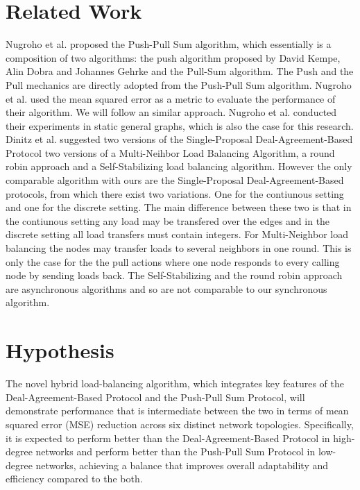 \section{Related Work}\label{sec:relatedwork}
Nugroho et al.\cite{nugroho2023PushPullSumDataAg} proposed the Push-Pull Sum algorithm, which essentially is a composition of two algorithms: the push algorithm proposed by David Kempe, Alin Dobra and Johannes Gehrke \cite{kempe2003gossipbasedComp} and the Pull-Sum algorithm. The Push and the Pull mechanics are directly adopted from the Push-Pull Sum algorithm. Nugroho et al. used the mean squared error as a metric to evaluate the performance of their algorithm. We will follow an similar approach. Nugroho et al. conducted their experiments in static general graphs, which is also the case for this research.  
Dinitz et al. \cite{Dinitz2023DAB} suggested two versions of the Single-Proposal Deal-Agreement-Based Protocol two versions of a Multi-Neihbor Load Balancing Algorithm, a round robin approach and a Self-Stabilizing load balancing algorithm. However the only comparable algorithm with ours are the Single-Proposal Deal-Agreement-Based protocols, from which there exist two variations. One for the contiunous setting and one for the discrete setting. The main difference between these two is that in the contiunous setting any load may be transfered over the edges and in the discrete setting all load transfers must contain integers. For Multi-Neighbor load balancing the nodes may transfer loads to several neighbors in one round. This is only the case for the the pull actions where one node responds to every calling node by sending loads back. The Self-Stabilizing and the round robin approach are asynchronous algorithms and so are not comparable to our synchronous algorithm.


\section{Hypothesis}\label{sec:hypothesis}
The novel hybrid load-balancing algorithm, which integrates key features of the Deal-Agreement-Based Protocol and the Push-Pull Sum Protocol, will demonstrate performance that is intermediate between the two in terms of mean squared error (MSE) reduction across six distinct network topologies. Specifically, it is expected to perform better than the Deal-Agreement-Based Protocol in high-degree networks and perform better than the Push-Pull Sum Protocol in low-degree networks, achieving a balance that improves overall adaptability and efficiency compared to the both.

